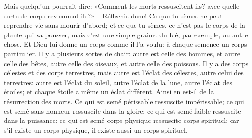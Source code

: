 Mais quelqu’un pourrait dire:
	«Comment les morts ressuscitent-ils?
	avec quelle sorte de corps reviennent-ils?»
– Réfléchis donc! Ce que tu sèmes ne peut reprendre vie sans mourir d’abord;
	et ce que tu sèmes, ce n’est pas le corps de la plante qui va pousser,
	mais c’est une simple graine: du blé, par exemple, ou autre chose.
Et Dieu lui donne un corps comme il l’a voulu:
	à chaque semence un corps particulier.
Il y a plusieurs sortes de chair:
	autre est celle des hommes, et autre celle des bêtes,
	autre celle des oiseaux, et autre celle des poissons.
Il y a des corps célestes et des corps terrestres,
	mais autre est l’éclat des célestes, autre celui des terrestres;
	autre est l’éclat du soleil, autre l’éclat de la lune,
		autre l’éclat des étoiles;
	et chaque étoile a même un éclat différent.
Ainsi en est-il de la résurrection des morts.
Ce qui est semé périssable ressuscite impérissable;
	ce qui est semé sans honneur ressuscite dans la gloire;
	ce qui est semé faible ressuscite dans la puissance;
	ce qui est semé corps physique ressuscite corps spirituel;
	car s’il existe un corps physique, il existe aussi un corps spirituel.

